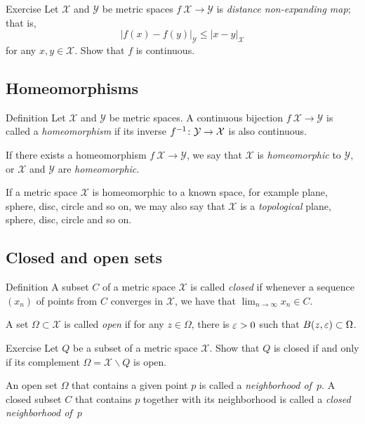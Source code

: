 \begin{thm}{Exercise}\label{ex:shrt=>continuous}
Let ${\mathcal X}$ and ${\mathcal Y}$ be metric spaces $f\:{\mathcal X}\to {\mathcal Y}$ is \emph{distance non-expanding map}; that is, 
\[|f(x)-f(y)|_{\mathcal Y}\le |x-y|_{\mathcal X}\]
for any $x,y\in \mathcal X$.
Show that $f$ is continuous.
\end{thm}

\subsection*{Homeomorphisms}

\begin{thm}{Definition}
Let ${\mathcal X}$ and ${\mathcal Y}$ be metric spaces.
A continuous bijection $f\:{\mathcal X}\to {\mathcal Y}$ 
is called a \emph{homeomorphism} 
if its inverse $f^{-1}\:{\mathcal Y}\z\to {\mathcal X}$ is also continuous.

If there exists a homeomorphism $f\:{\mathcal X}\to {\mathcal Y}$,
we say that ${\mathcal X}$ is {}\emph{homeomorphic} to ${\mathcal Y}$,
or  $\mathcal X$ and ${\mathcal Y}$ are {}\emph{homeomorphic}.
\end{thm}

If a metric space $\mathcal X$ is homeomorphic to a known space, for example plane, sphere, disc, circle and so on,
we may also say that $\mathcal X$ is a \emph{topological} plane, sphere, disc, circle and so on.

\subsection*{Closed and open sets}

\begin{thm}{Definition}
A subset $C$ of a metric space $\mathcal{X}$ is called \emph{closed} if whenever a sequence $(x_n)$ of points from $C$ converges in $\mathcal{X}$, we have that $\lim_{n\to\infty} x_n \in C$.

A set $\Omega \subset \mathcal{X}$ is called \emph{open} if for any $z\in \Omega$, 
there is $\varepsilon>0$ such that $B(z,\varepsilon)\subset\Omega$.
\end{thm}

\begin{thm}{Exercise}\label{ex:close-open}
Let $Q$ be a subset of a metric space $\mathcal{X}$.
Show that $Q$ is closed if and only if its complement $\Omega=\mathcal{X}\backslash Q$ is open.
\end{thm}

An open set $\Omega$ that contains a given point $p$ is called a \emph{neighborhood of~$p$}.
A closed subset $C$ that contains $p$ together with its neighborhood is called a {}\emph{closed neighborhood of~$p$}
